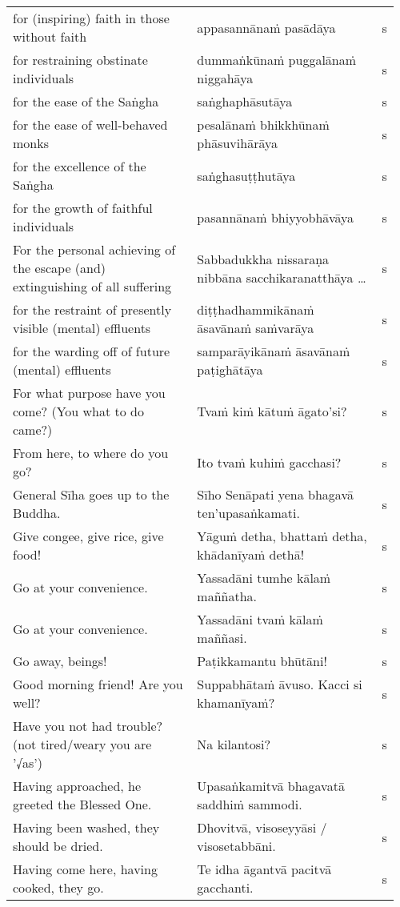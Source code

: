 \documentclass[a5paper]{memoir}
\begin{document}
\begin{longtable}{L{0.48\linewidth} L{0.48\linewidth} H}
for (inspiring) faith in those without faith & appasannānaṁ pasādāya & s\\[0pt]
for restraining obstinate individuals & dummaṅkūnaṁ puggalānaṁ niggahāya & s\\[0pt]
for the ease of the Saṅgha & saṅghaphāsutāya & s\\[0pt]
for the ease of well-behaved monks & pesalānaṁ bhikkhūnaṁ phāsuvihārāya & s\\[0pt]
for the excellence of the Saṅgha & saṅghasuṭṭhutāya & s\\[0pt]
for the growth of faithful individuals & pasannānaṁ bhiyyobhāvāya & s\\[0pt]
For the personal achieving of the escape (and) extinguishing of all suffering & Sabbadukkha nissaraṇa nibbāna sacchikaranatthāya \ldots{} & s\\[0pt]
for the restraint of presently visible (mental) effluents & diṭṭhadhammikānaṁ āsavānaṁ saṁvarāya & s\\[0pt]
for the warding off of future (mental) effluents & samparāyikānaṁ āsavānaṁ paṭighātāya & s\\[0pt]
For what purpose have you come? (You what to do came?) & Tvaṁ kiṁ kātuṁ āgato'si? & s\\[0pt]
From here, to where do you go? & Ito tvaṁ kuhiṁ gacchasi? & s\\[0pt]
General Sīha goes up to the Buddha. & Sīho Senāpati yena bhagavā ten'upasaṅkamati. & s\\[0pt]
Give congee, give rice, give food! & Yāguṁ detha, bhattaṁ detha, khādanīyaṁ dethā! & s\\[0pt]
Go at your convenience. & Yassadāni tumhe kālaṁ maññatha. & s\\[0pt]
Go at your convenience. & Yassadāni tvaṁ kālaṁ maññasi. & s\\[0pt]
Go away, beings! & Paṭikkamantu bhūtāni! & s\\[0pt]
Good morning friend! Are you well? & Suppabhātaṁ āvuso. Kacci si khamanīyaṁ? & s\\[0pt]
Have you not had trouble? (not tired/weary you are '√as') & Na kilantosi? & s\\[0pt]
Having approached, he greeted the Blessed One. & Upasaṅkamitvā bhagavatā saddhiṁ sammodi. & s\\[0pt]
Having been washed, they should be dried. & Dhovitvā, visoseyyāsi / visosetabbāni. & s\\[0pt]
Having come here, having cooked, they go. & Te idha āgantvā pacitvā gacchanti. & s\\[0pt]

\end{longtable}
\end{document}
